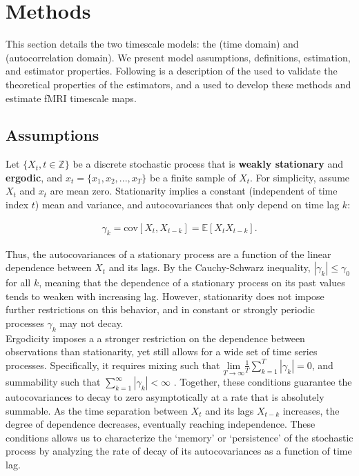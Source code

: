 \documentclass[main.tex]{subfiles}
\begin{document}
\section{Methods}

This section details the two timescale models: the  (time domain) and  (autocorrelation domain). We present model assumptions, definitions, estimation, and estimator properties. Following is a description of the  used to validate the theoretical properties of the estimators, and a  used to develop these methods and estimate fMRI timescale maps.

\subsection{Assumptions}

Let $\{X_t, t\in \mathbb{Z}\}$ be a discrete stochastic process that is \textbf{weakly stationary} and \textbf{ergodic}, and $x_t = \{x_1, x_2, ..., x_T\}$ be a finite sample of $X_t$. For simplicity, assume $X_t$ and $x_t$ are mean zero. Stationarity implies a constant (independent of time index $t$) mean and variance, and autocovariances that only depend on time lag $k$:

\begin{align*} 
    \gamma_k = \text{cov}[X_t, X_{t-k}] = \mathbb{E}[X_t X_{t-k}].
\end{align*}

Thus, the autocovariances of a stationary process are a function of the linear dependence between $X_t$ and its lags. By the Cauchy-Schwarz inequality, $|\gamma_k|\le \gamma_0$ for all $k$, meaning that the dependence of a stationary process on its past values tends to weaken with increasing lag. However, stationarity does not impose further restrictions on this behavior, and in constant or strongly periodic processes $\gamma_k$ may not decay.\\

Ergodicity imposes a a stronger restriction on the dependence between observations than stationarity, yet still allows for a wide set of time series processes. Specifically, it requires mixing such that $\underset{T\to\infty}{\text{lim}} \frac{1}{T} \sum_{k=1}^T |\gamma_k| = 0$, and summability such that $\sum_{k=1}^\infty |\gamma_k| < \infty$ \cite{hansen_econometrics_2022}. Together, these conditions guarantee the autocovariances to decay to zero asymptotically at a rate that is absolutely summable. As the time separation between $X_t$ and its lags $X_{t-k}$ increases, the degree of dependence decreases, eventually reaching independence. These conditions allows us to characterize the `memory' or `persistence' of the stochastic process by analyzing the rate of decay of its autocovariances as a function of time lag.\\
\end{document}
